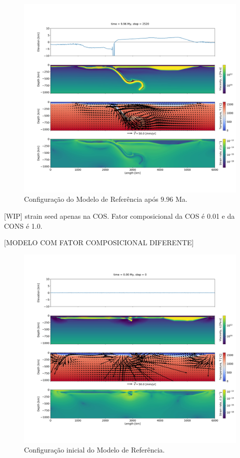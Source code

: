 \begin{figure}
    \centering
    \includegraphics[trim={5cm 14cm 2cm 12cm}, clip, width=1.0 \textwidth]{fig/strak_32-11.png}
    \caption{Configuração do Modelo de Referência após $9.96$ Ma.}
    \label{fig:fim-referencia}
\end{figure}

[WIP] strain seed apenas na COS. Fator composicional da COS é 0.01 e da CONS é 1.0.

[MODELO COM FATOR COMPOSICIONAL DIFERENTE]

\begin{figure}
    \centering
    \includegraphics[trim={5cm 14cm 2cm 12cm}, clip, width=1.0 \textwidth]{fig/strak_32-00.png}
    \caption{Configuração inicial do Modelo de Referência.}
    \label{fig:inicio-referencia}
\end{figure}


